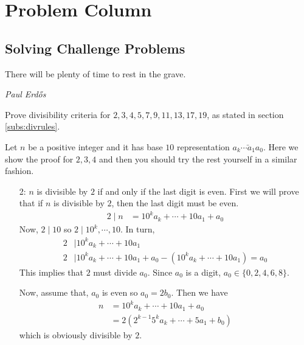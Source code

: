 \part{Problem Column}
\chapter{Solving Challenge Problems}\label{ch:solved}

\epigraph{There will be plenty of time to rest in the grave.}{\textit{Paul Erd\H{o}s}}

\begin{problem}
	Prove divisibility criteria for $2,3,4,5,7,9,11,13,17,19$, as stated in section \eqref{subs:divrules}\watermark.
\end{problem}

\begin{solution}
	Let $n$ be a positive integer and it has base $10$ representation $\bar{a_k\cdots a_1a_0}$. Here we show the proof for $2,3,4$ and then you should try the rest yourself in a similar fashion.
		\begin{enumerate}
			\item[2:] $n$ is divisible by $2$ if and only if the last digit is even. First we will prove that if $n$ is divisible by $2$, then the last digit must be even.
					\begin{align*}
						2\mid n & = 10^ka_k+\cdots+10a_1+a_0
					\end{align*}
				Now, $2\mid 10$ so $2\mid 10^k,\cdots,10$. In turn,
					\begin{align*}
						2 & \mid 10^ka_k+\cdots+10a_1\\
						2 & \mid 10^ka_k+\cdots+10a_1+a_0-(10^ka_k+\cdots+10a_1)=a_0
					\end{align*}
				This implies that $2$ must divide $a_0$. Since $a_0$ is a digit, $a_0\in\{0,2,4,6,8\}$.

				Now, assume that, $a_0$ is even so $a_0=2b_0$. Then we have
					\begin{align*}
						n & = 10^ka_k+\cdots+10a_1+a_0\\
				  & = 2(2^{k-1}5^ka_k+\cdots+5a_1+b_0)
					\end{align*}
				which is obviously divisible by $2$.


\end{enumerate}
\end{solution}
